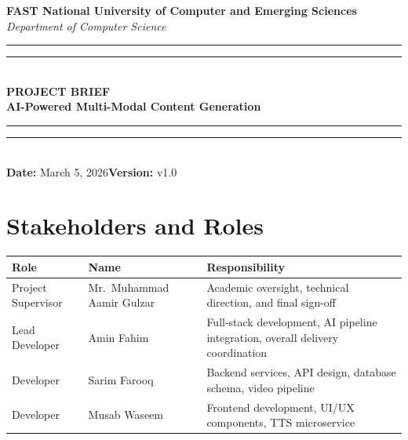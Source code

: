 ﻿\documentclass[12pt, a4paper]{article}
\newcommand{\thead}[1]{\cellcolor{headerbg}\textcolor{headertext}{\textbf{#1}}}
\newcommand{\talt}{\rowcolor{rowalt}}
\begin{document}
\begin{mdframed}[
  backgroundcolor   = headerbg,
  linecolor         = headerbg,
  innertopmargin    = 24pt,
  innerbottommargin = 24pt,
  innerleftmargin   = 20pt,
  innerrightmargin  = 20pt,
  roundcorner       = 4pt
]
  \begin{center}
    {\large\bfseries\color{white}
      FAST National University of Computer and Emerging Sciences}\\[6pt]
    {\small\itshape\color{white}Department of Computer Science}\\[16pt]
    {\color{white}\rule{\linewidth}{0.5pt}\vspace{2pt}\rule{\linewidth}{1.5pt}}\\[10pt]
    {\LARGE\bfseries\color{accentorange}PROJECT BRIEF}\\[8pt]
    {\Large\bfseries\color{white}AI-Powered Multi-Modal Content Generation}\\[16pt]
    {\color{white}\rule{\linewidth}{1.5pt}\vspace{2pt}\rule{\linewidth}{0.5pt}}\\[12pt]
    {\normalsize\color{white}
      \textbf{Date:} March 5, 2026\quad\textbf{Version:} v1.0}
  \end{center}
\end{mdframed}

\vspace{18pt}

\section{Stakeholders and Roles}

\begin{tabular}{>{\raggedright\arraybackslash}p{3.0cm}
                >{\raggedright\arraybackslash}p{4.4cm}
                >{\raggedright\arraybackslash}p{7.4cm}}
  \toprule
  \thead{Role} & \thead{Name} & \thead{Responsibility} \\
  \midrule
  Project Supervisor
    & Mr.\ Muhammad Aamir Gulzar
    & Academic oversight, technical direction, and final sign-off \\
  \talt
  Lead Developer
    & Amin Fahim
    & Full-stack development, AI pipeline integration, overall delivery coordination \\
  Developer
    & Sarim Farooq
    & Backend services, API design, database schema, video pipeline \\
  \talt
  Developer
    & Musab Waseem
    & Frontend development, UI/UX components, TTS microservice \\
  \bottomrule
\end{tabular}
\end{document}
